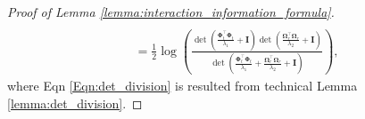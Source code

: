 \begin{proof}[Proof of Lemma \ref{lemma:interaction_information_formula}]
\begin{align}
\\ 
        & = \frac{1}{2}  \log \left(\frac{\det(\frac{\boldsymbol{\Phi}_t^\top \boldsymbol{\Phi}_t}{\lambda_1} + \mathbf{I})\det(\frac{\boldsymbol{\Omega}_r^\top \boldsymbol{\Omega}_r}{\lambda_2} + \mathbf{I})}{\det(\frac{\boldsymbol{\Phi}_t^\top \boldsymbol{\Phi}_t}{\lambda_1} + \frac{\boldsymbol{\Omega}_r^\top \boldsymbol{\Omega}_r}{\lambda_2} + \mathbf{I})} \right), \nonumber
\end{align}
where Eqn \ref{Eqn:det_division} is resulted from technical Lemma \ref{lemma:det_division}. 
\end{proof}


